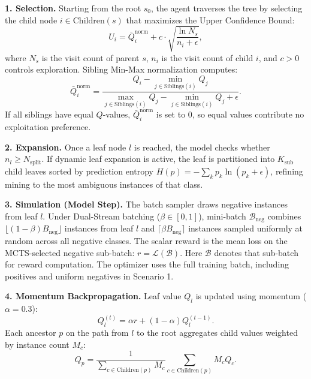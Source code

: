\documentclass[11pt]{article}
\begin{document}
\textbf{1. Selection.} Starting from the root $s_0$, the agent traverses the tree by selecting the child node $i \in \text{Children}(s)$ that maximizes the Upper Confidence Bound:
\begin{equation}
    U_i = \bar{Q}_i^{\text{norm}} + c \cdot \sqrt{\frac{\ln N_s}{n_i + \epsilon}},
    \label{eq:ucb1}
\end{equation}
where $N_s$ is the visit count of parent $s$, $n_i$ is the visit count of child $i$, and $c > 0$ controls exploration. Sibling Min-Max normalization computes:
\begin{equation}
    \bar{Q}_i^{\text{norm}} = \frac{Q_i - \min_{j \in \text{Siblings}(i)} Q_j}{\max_{j \in \text{Siblings}(i)} Q_j - \min_{j \in \text{Siblings}(i)} Q_j + \epsilon}.
    \label{eq:qnorm}
\end{equation}
If all siblings have equal $Q$-values, $\bar{Q}_i^{\text{norm}}$ is set to $0$, so equal values contribute no exploitation preference.

\textbf{2. Expansion.} Once a leaf node $l$ is reached, the model checks whether $n_l \ge N_{\text{split}}$. If dynamic leaf expansion is active, the leaf is partitioned into $K_{\text{sub}}$ child leaves sorted by prediction entropy $H(p) = -\sum_k p_k \ln(p_k + \epsilon)$, refining mining to the most ambiguous instances of that class.

\textbf{3. Simulation (Model Step).} The batch sampler draws negative instances from leaf $l$. Under Dual-Stream batching ($\beta \in [0, 1]$), mini-batch $\mathcal{B}_{\text{neg}}$ combines $\lfloor (1 - \beta) B_{\text{neg}} \rfloor$ instances from leaf $l$ and $\lceil \beta B_{\text{neg}} \rceil$ instances sampled uniformly at random across all negative classes. The scalar reward is the mean loss on the MCTS-selected negative sub-batch: $r = \mathcal{L}(\mathcal{B})$. Here $\mathcal{B}$ denotes that sub-batch for reward computation. The optimizer uses the full training batch, including positives and uniform negatives in Scenario 1.

\textbf{4. Momentum Backpropagation.} Leaf value $Q_l$ is updated using momentum ($\alpha = 0.3$):
\begin{equation}
    Q_l^{(t)} = \alpha r + (1 - \alpha) Q_l^{(t-1)}.
    \label{eq:momentum}
\end{equation}
Each ancestor $p$ on the path from $l$ to the root aggregates child values weighted by instance count $M_c$:
\begin{equation}
    Q_p = \frac{1}{\sum_{c \in \text{Children}(p)} M_c} \sum_{c \in \text{Children}(p)} M_c Q_c.
    \label{eq:ancestor}
\end{equation}
\end{document}
